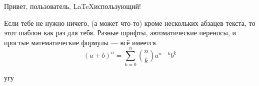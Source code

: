 \documentclass[12pt]{article}
\begin{document}
{\LARGE Привет, пользователь, \LaTeX использующий!}
\bigskip

Если тебе не нужно ничего, (а может что-то) кроме нескольких абзацев текста, то этот шаблон как раз для тебя.
{ Разные шрифты}, автоматические переносы, и простые математические
формулы --- всё имеется.
\Large
$$
(a + b)^n = \sum_{k=0}^n{n\choose k}a^{n-k}b^k
$$

\bigskip
{}
угу
\end{document}
